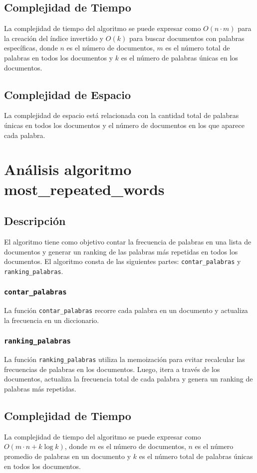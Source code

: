 \documentclass{article}
\begin{document}
\subsection{Complejidad de Tiempo}
La complejidad de tiempo del algoritmo se puede expresar como $O(n \cdot m)$ para la creación del índice invertido y $O(k)$ para buscar documentos con palabras específicas, donde $n$ es el número de documentos, $m$ es el número total de palabras en todos los documentos y $k$ es el número de palabras únicas en los documentos.

\subsection{Complejidad de Espacio}
La complejidad de espacio está relacionada con la cantidad total de palabras únicas en todos los documentos y el número de documentos en los que aparece cada palabra.

\section{Análisis algoritmo most\_repeated\_words}

\subsection{Descripción}
El algoritmo tiene como objetivo contar la frecuencia de palabras en una lista de documentos y generar un ranking de las palabras más repetidas en todos los documentos. El algoritmo consta de las siguientes partes: \texttt{contar\_palabras} y \texttt{ranking\_palabras}.

\subsubsection{\texttt{contar\_palabras}}
La función \texttt{contar\_palabras} recorre cada palabra en un documento y actualiza la frecuencia en un diccionario.

\subsubsection{\texttt{ranking\_palabras}}
La función \texttt{ranking\_palabras} utiliza la memoización para evitar recalcular las frecuencias de palabras en los documentos. Luego, itera a través de los documentos, actualiza la frecuencia total de cada palabra y genera un ranking de palabras más repetidas.

\subsection{Complejidad de Tiempo}
La complejidad de tiempo del algoritmo se puede expresar como $O(m \cdot n + k \log k)$, donde $m$ es el número de documentos, $n$ es el número promedio de palabras en un documento y $k$ es el número total de palabras únicas en todos los documentos.
\end{document}
